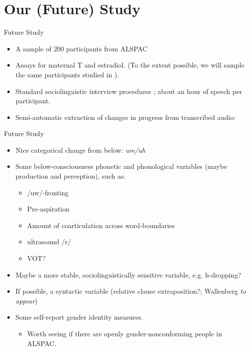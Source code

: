\documentclass[hyperref={pdfpagelabels=false}]{beamer}
\begin{document}
\section{Our (Future) Study}

\begin{frame}{Future Study}
\begin{itemize}
	\item A sample of 200 participants from ALSPAC
	\item Assays for maternal T and estradiol. (To the extent possible, we will sample the same participants studied in \citealt{hinesetal2002}). 
	\item Standard sociolinguistic interview procedures \citep{tagliamonte2006}; about an hour of speech per participant.
	\item Semi-automatic extraction of changes in progress from transcribed audio:
\end{itemize}
\end{frame}

\begin{frame}{Future Study}
\begin{itemize}
	
	\item Nice categorical change from below: \textsl{um/uh}
	\item Some below-consciousness phonetic and phonological variables (maybe production and perception), such as:
			\begin{itemize}
			\item /uw/-fronting
			\item Pre-aspiration
			\item Amount of coarticulation across word-boundaries
			\item ultrasound /r/
			\item VOT?
			
			\end{itemize}
	\item Maybe a more stable, sociolinguistically sensitive variable, e.g. h-dropping?
	\item If possible, a syntactic variable (relative clause extraposition?; Wallenberg \textsl{to appear})

	\item Some self-report gender identity measures.
		\begin{itemize}
			\item Worth seeing if there are openly gender-nonconforming people in ALSPAC.
		\end{itemize}
		\end{itemize}

\end{frame}
\end{document}
